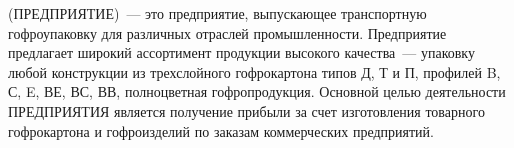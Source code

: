 


\FIRMA (ПРЕДПРИЯТИЕ)~--- это предприятие, выпускающее транспортную гофроупаковку для различных отраслей промышленности. Предприятие предлагает широкий ассортимент продукции высокого качества~--- упаковку любой конструкции из трехслойного гофрокартона типов Д, Т и П, профилей B, С, E, ВЕ, ВС, ВВ, полноцветная гофропродукция. Основной целью деятельности ПРЕДПРИЯТИЯ является получение прибыли за счет изготовления товарного гофрокартона и гофроизделий по заказам коммерческих предприятий.


